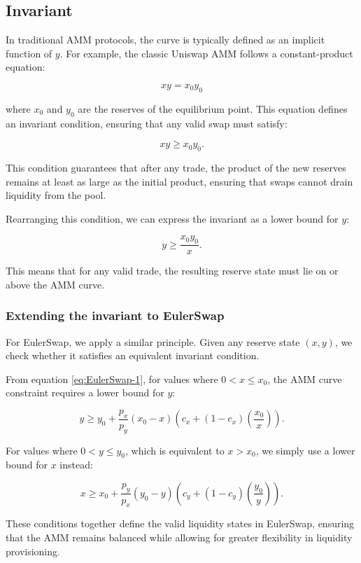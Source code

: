 \documentclass{article}
\begin{document}
\subsection{Invariant}
\label{sec:invariant}

In traditional AMM protocols, the curve is typically defined as an implicit function of $y$. For example, the classic Uniswap AMM follows a constant-product equation:

\begin{equation}
    xy = x_0 y_0
\end{equation}

where $x_0$ and $y_0$ are the reserves of the equilibrium point. This equation defines an invariant condition, ensuring that any valid swap must satisfy:

\begin{equation}
    xy \geq x_0 y_0.
\end{equation}

This condition guarantees that after any trade, the product of the new reserves remains at least as large as the initial product, ensuring that swaps cannot drain liquidity from the pool.

Rearranging this condition, we can express the invariant as a lower bound for $y$:

\begin{equation}
    y \geq \frac{x_0 y_0}{x}.
\end{equation}

This means that for any valid trade, the resulting reserve state must lie on or above the AMM curve.  

\subsubsection{Extending the invariant to EulerSwap}

For EulerSwap, we apply a similar principle. Given any reserve state $(x, y)$, we check whether it satisfies an equivalent invariant condition.

From equation \eqref{eq:EulerSwap-1}, for values where \( 0 < x \leq x_0 \), the AMM curve constraint requires a lower bound for $y$:

\begin{equation}
    \label{eq:invariant-x1}
    y \geq y_{0}+\frac{p_{x}}{p_{y}}\left(x_{0}-x\right)\left(c_{x}+\left(1-c_{x}\right)\left(\frac{x_{0}}{x}\right)\right).
\end{equation}

For values where \( 0 < y \leq y_0 \), which is equivalent to \( x > x_0 \), we simply use a lower bound for $x$ instead:

\begin{equation}
    \label{eq:invariant-x2}
    x \geq x_{0}+\frac{p_{y}}{p_{x}}\left(y_{0}-y\right)\left(c_{y}+\left(1-c_{y}\right)\left(\frac{y_{0}}{y}\right)\right).
\end{equation}

These conditions together define the valid liquidity states in EulerSwap, ensuring that the AMM remains balanced while allowing for greater flexibility in liquidity provisioning.
\end{document}
